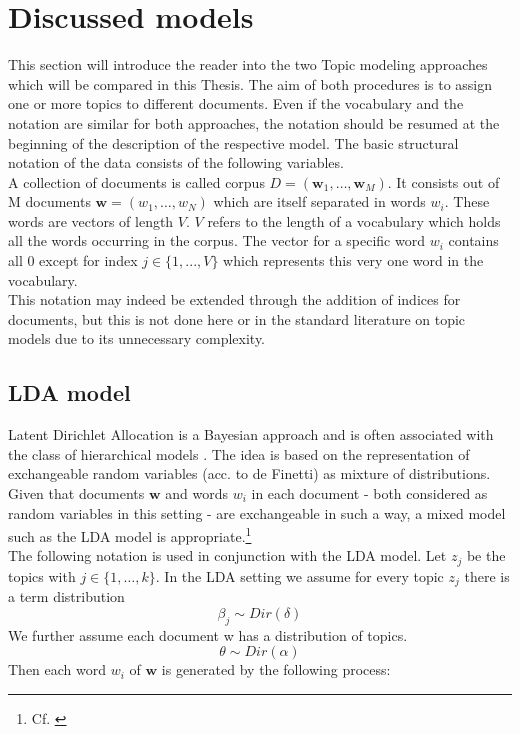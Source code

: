 \documentclass[11pt,a4paper]{article}
\author{Sebastian Knigge}
\begin{document}
\section{Discussed models}

This section will introduce the reader into the two Topic modeling approaches which will be compared in this Thesis. The aim of both procedures is to assign one or more topics to different documents. Even if the vocabulary and the notation are similar for both approaches, the notation should be resumed at the beginning of the description of the respective model. The basic structural notation of the data consists of the following variables.\\
A collection of documents is called corpus $D=(\textbf{w}_1,\dots , \textbf{w}_M)$. It consists out of M documents $\textbf{w}=(w_1,\dots, w_N)$ which are itself separated in words $w_i$. These words are vectors of length $V$. $V$ refers to the length of a vocabulary which holds all the words occurring in the corpus. The vector for a specific word $w_i$ contains all 0 except for index $j\in\{1,...,V\}$ which represents this very one word in the vocabulary.\\
This notation may indeed be extended through the addition of indices for documents, but this is not done here or in the standard literature on topic models due to its unnecessary complexity.\\

\subsection{LDA model}

Latent Dirichlet Allocation is a Bayesian approach and is often associated with the class of hierarchical models \cite{Gelman2014}. The idea is based on the representation of exchangeable random variables (acc. to de Finetti) as mixture of distributions. Given that documents $\textbf{w}$ and words $w_i$ in each document - both considered as random variables in this setting - are exchangeable in such a way, a mixed model such as the LDA model is appropriate.\footnote{Cf. \cite{Blei2003}}\\

The following notation is used in conjunction with the LDA model. Let $z_j$ be the topics with $j\in\{1,\dots,k\}$. In the LDA setting we assume for  every topic $z_j$ there is a term distribution
$$\beta_j \sim Dir(\delta)$$
We further assume each document w has a distribution of topics.
$$\theta \sim Dir(\alpha)$$
Then each word $w_i$ of $\textbf{w}$ is generated by the following process:
\end{document}
